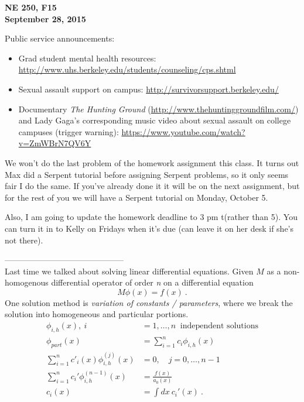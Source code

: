 \documentclass[12pt]{article}
\begin{document}
\begin{center}
{\bf NE 250, F15\\
September 28, 2015 
}
\end{center}

Public service announcements: 
\begin{itemize}
\item Grad student mental health resources: \href{http://www.uhs.berkeley.edu/students/counseling/cps.shtml}{http://www.uhs.berkeley.edu/students/counseling/cps.shtml}
\item Sexual assault support on campus: \href{http://survivorsupport.berkeley.edu/}{http://survivorsupport.berkeley.edu/}
\item Documentary \textit{The Hunting Ground} (\href{http://www.thehuntinggroundfilm.com/}{http://www.thehuntinggroundfilm.com/}) and Lady Gaga's corresponding music video about sexual assault on college campuses (trigger warning): \href{https://www.youtube.com/watch?v=ZmWBrN7QV6Y}{https://www.youtube.com/watch?v=ZmWBrN7QV6Y}
\end{itemize}

We won't do the last problem of the homework assignment this class. It turns out Max did a Serpent tutorial before assigning Serpent problems, so it only seems fair I do the same. If you've already done it it will be on the next assignment, but for the rest of you we will have a Serpent tutorial on Monday, October 5.

Also, I am going to update the homework deadline to 3 pm t(rather than 5).
You can turn it in to Kelly on Fridays when it's due (can leave it on her desk if she's not there).

--------------------------------------------\\
Last time we talked about solving linear differential equations. 
Given $M$ as a non-homogenous differential operator of order \emph{n} on a differential equation
%
\begin{equation*}
M\phi(x) = f(x) \:.
\end{equation*}
%
One solution method is \textit{variation of constants / parameters}, where we break the solution into homogeneous and particular portions.
\begin{align*}
\phi_{i,h}(x),  \:i &= 1,\dotsc, n \:\text{ independent solutions} \\
\phi_{part}(x) &= \sum_{i=1}^n c_i\phi_{i,h}(x)\\
\sum_{i=1}^n c'_i(x) \phi^{(j)}_{i,h}(x) &= 0, \quad j = 0, \dots, n-1 \\
\sum_{i=1}^n c_i'\phi^{(n-1)}_{i,h}(x) &= \frac{f(x)}{a_0(x)} \\
c_i(x)& = \int dx\:c_i'(x) \:.
\end{align*}
\end{document}
